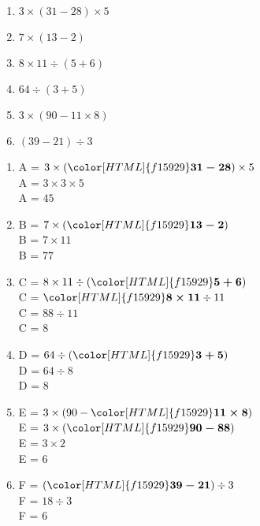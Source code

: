 \begin{exercice*}
   \begin{multicols}{2}
      \begin{enumerate}
         \item $3\times(31-28)\times5$
         \item $7\times(13-2)$
         \item $8\times11\div(5+6)$
         \item $64\div(3+5)$
         \item $3\times(90-11\times8)$
         \item $(39-21)\div3$
      \end{enumerate}
   \end{multicols}
\end{exercice*}
\begin{corrige}
   \begin{enumerate}
      \item A = $3\times({\color[HTML]{f15929}\boldsymbol{31-28}})\times5$ \\A = $3\times3\times5$ \\A = $45$ \\
      \item B = $7\times({\color[HTML]{f15929}\boldsymbol{13-2}})$ \\B = $7\times11$ \\B = $77$ \\
      \item C = $8\times11\div({\color[HTML]{f15929}\boldsymbol{5+6}})$ \\C = ${\color[HTML]{f15929}\boldsymbol{8\times11}}\div11$ \\C = $88\div11$ \\C = $8$ \\
      \item D = $64\div({\color[HTML]{f15929}\boldsymbol{3+5}})$ \\D = $64\div8$ \\D = $8$ \\
      \item E = $3\times(90-{\color[HTML]{f15929}\boldsymbol{11\times8}})$ \\E = $3\times({\color[HTML]{f15929}\boldsymbol{90-88}})$ \\E = $3\times2$ \\E = $6$ \\
      \item F = $({\color[HTML]{f15929}\boldsymbol{39-21}})\div3$ \\F = $18\div3$ \\F = $6$ \\
      \end{enumerate}
\end{corrige}
 
